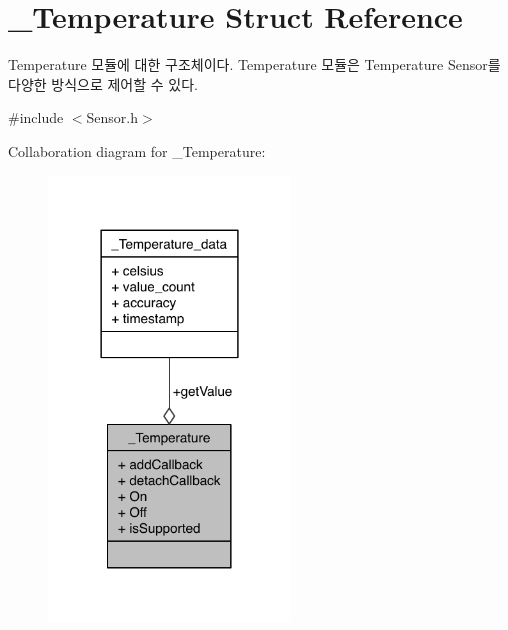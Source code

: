 \hypertarget{struct__Temperature}{\section{\-\_\-\-Temperature Struct Reference}
\label{struct__Temperature}
}


Temperature 모듈에 대한 구조체이다. Temperature 모듈은 Temperature Sensor를 다양한 방식으로 제어할 수 있다.  




{\ttfamily \#include $<$Sensor.\-h$>$}



Collaboration diagram for \-\_\-\-Temperature\-:\nopagebreak
\begin{figure}[H]
\begin{center}
\leavevmode
\includegraphics[width=182pt]{db/dcb/struct__Temperature__coll__graph}
\end{center}
\end{figure}
